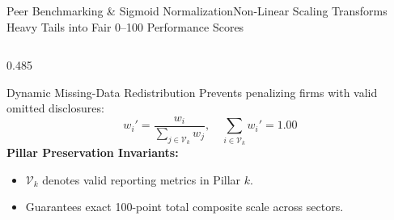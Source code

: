 \begin{frame}{Peer Benchmarking \& Sigmoid Normalization}{Non-Linear Scaling Transforms Heavy Tails into Fair 0--100 Performance Scores}
\begin{columns}[T,onlytextwidth]
\begin{column}{0.485\textwidth}
            \begin{quantcard}[height=2.74cm]{Dynamic Missing-Data Redistribution}
                \fontsize{5.5pt}{6.7pt}\selectfont
                Prevents penalizing firms with valid omitted disclosures:
                \begin{equation*}
                    \textstyle w_i' = \frac{w_i}{\sum_{j \in \mathcal{V}_k} w_j}, \quad \sum_{i \in \mathcal{V}_k} w_i' = 1.00
                \end{equation*}
                \textbf{\color{deepemerald}Pillar Preservation Invariants:}
                \begin{itemize}
                    \setlength{\itemsep}{0.2pt}
                    \item $\mathcal{V}_k$ denotes valid reporting metrics in Pillar $k$.
                    \item Guarantees exact 100-point total composite scale across sectors.
                \end{itemize}
            \end{quantcard}
        \end{column}
    \end{columns}
\end{frame}
